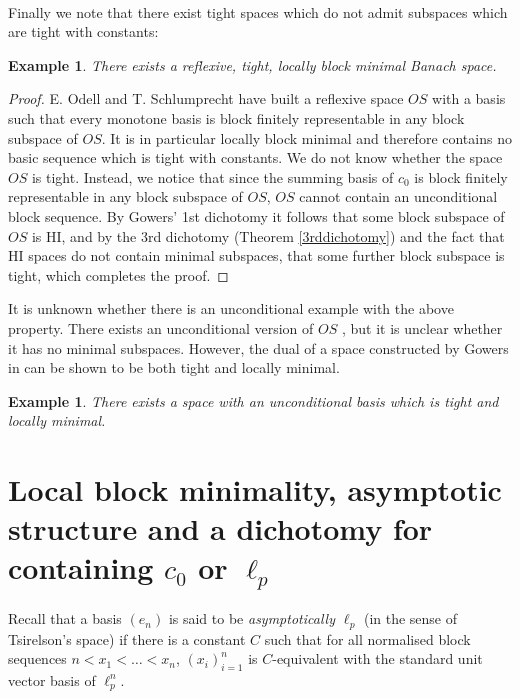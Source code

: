 \documentclass[10pt]{amsart}
\numberwithin{equation}{section}
\newtheorem{ex}[thm]{Example}
\begin{document}
\

Finally we note that there exist tight spaces which do not admit subspaces
which are tight with constants:

\begin{ex}\label{OdellSchlumprecht}
There exists a reflexive, tight, locally block minimal Banach space.
\end{ex}

\begin{proof}
E. Odell and T. Schlumprecht \cite{OS:universalhi}  have built a reflexive
space $OS$ with a basis such that every monotone basis is block finitely
representable in any block subspace of $OS$. It is in particular locally block
minimal and therefore contains no basic sequence which is tight with constants.
We do not know whether the space $OS$  is tight. Instead, we notice that since
the summing basis of $c_0$ is block finitely representable in any block
subspace of $OS$, $OS$ cannot contain an unconditional block sequence. By
Gowers' 1st dichotomy it follows that some block subspace of $OS$ is HI, and by
the 3rd dichotomy (Theorem \ref{3rddichotomy}) and the fact that HI spaces do
not contain minimal subspaces, that some further block subspace is tight, which
completes the proof.
\end{proof}

It is unknown whether there is an unconditional example with the above
property. There exists an unconditional version of $OS$ \cite{OS:universalunc},
but it is unclear whether it has no minimal subspaces. However, the dual of a
space constructed by Gowers in \cite{g:hyperplanes} can be shown to be both
tight and locally minimal.
\begin{ex}\label{gunc}\cite{exemples}
There exists a space with an unconditional basis which is tight and locally
minimal.
\end{ex}

\section{Local block minimality, asymptotic structure and a dichotomy for containing $c_0$ or $\ell_p$}
Recall that a basis $(e_n)$ is said to be {\em asymptotically $\ell_p$} (in the
sense of Tsirelson's space) if there is a constant $C$
such that for all normalised block sequences $n<x_1<\ldots<x_n$,
$(x_i)_{i=1}^n$ is $C$-equivalent with the standard unit vector basis of
$\ell_p^n$.
\end{document}
